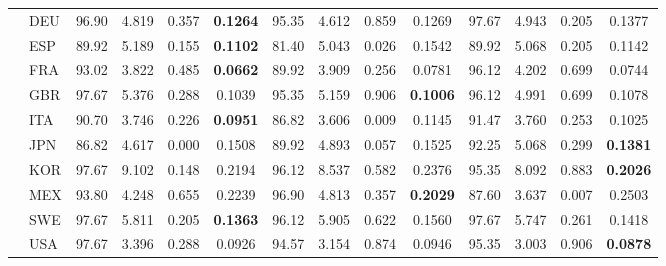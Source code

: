 \begin{tabular}{llcccccccccccc}
 &     DEU  &  96.90  &  4.819  &  0.357  &  \textbf{0.1264}  &  95.35  &  4.612  &  0.859  &  0.1269  &  97.67  &  4.943  &  0.205  &  0.1377 \\ 
 &     ESP  &  89.92  &  5.189  &  0.155  &  \textbf{0.1102}  &  81.40  &  5.043  &  0.026  &  0.1542  &  89.92  &  5.068  &  0.205  &  0.1142 \\ 
 &     FRA  &  93.02  &  3.822  &  0.485  &  \textbf{0.0662}  &  89.92  &  3.909  &  0.256  &  0.0781  &  96.12  &  4.202  &  0.699  &  0.0744 \\ 
 &     GBR  &  97.67  &  5.376  &  0.288  &  0.1039  &  95.35  &  5.159  &  0.906  &  \textbf{0.1006}  &  96.12  &  4.991  &  0.699  &  0.1078 \\ 
 &     ITA  &  90.70  &  3.746  &  0.226  &  \textbf{0.0951}  &  86.82  &  3.606  &  0.009  &  0.1145  &  91.47  &  3.760  &  0.253  &  0.1025 \\ 
 &     JPN  &  86.82  &  4.617  &  0.000  &  0.1508  &  89.92  &  4.893  &  0.057  &  0.1525  &  92.25  &  5.068  &  0.299  &  \textbf{0.1381} \\ 
 &     KOR  &  97.67  &  9.102  &  0.148  &  0.2194  &  96.12  &  8.537  &  0.582  &  0.2376  &  95.35  &  8.092  &  0.883  &  \textbf{0.2026} \\ 
 &     MEX  &  93.80  &  4.248  &  0.655  &  0.2239  &  96.90  &  4.813  &  0.357  &  \textbf{0.2029}  &  87.60  &  3.637  &  0.007  &  0.2503 \\ 
 &     SWE  &  97.67  &  5.811  &  0.205  &  \textbf{0.1363}  &  96.12  &  5.905  &  0.622  &  0.1560  &  97.67  &  5.747  &  0.261  &  0.1418 \\ 
 &     USA  &  97.67  &  3.396  &  0.288  &  0.0926  &  94.57  &  3.154  &  0.874  &  0.0946  &  95.35  &  3.003  &  0.906  &  \textbf{0.0878} \\ 
\toprule
\end{tabular}



